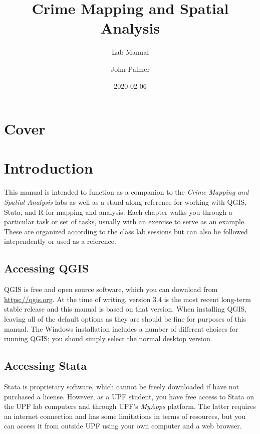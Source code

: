 \documentclass[]{book}
\title{Crime Mapping and Spatial Analysis}
\subtitle{Lab Manual}
\author{John Palmer}
\date{2020-02-06}
\begin{document}
\maketitle

{
\setcounter{tocdepth}{1}
\tableofcontents
}
\hypertarget{cover}{%
\chapter*{Cover}\label{cover}}

\hypertarget{introduction}{%
\chapter*{Introduction}\label{introduction}}

This manual is intended to function as a companion to the \emph{Crime Mapping and Spatial Analysis} labs as well as a stand-along reference for working with QGIS, Stata, and R for mapping and analysis. Each chapter walks you through a particular task or set of tasks, usually with an exercise to serve as an example. These are organized according to the class lab sessions but can also be followed intependently or used as a reference.

\hypertarget{accessing-qgis}{%
\section*{Accessing QGIS}\label{accessing-qgis}}

QGIS is free and open source software, which you can download from \url{https://qgis.org}. At the time of writing, version 3.4 is the most recent long-term stable release and this manual is based on that version. When installing QGIS, leaving all of the default options as they are should be fine for purposes of this manual. The Windows installation includes a number of different choices for running QGIS; you shoud simply select the normal desktop version.

\hypertarget{accessing-stata}{%
\section*{Accessing Stata}\label{accessing-stata}}

Stata is proprietary software, which cannot be freely downloaded if have not purchased a license. However, as a UPF student, you have free access to Stata on the UPF lab computers and through UPF's \emph{MyApps} platform. The latter requires an internet connection and has some limitations in terms of resources, but you can access it from outside UPF using your own computer and a web browser.
\end{document}
